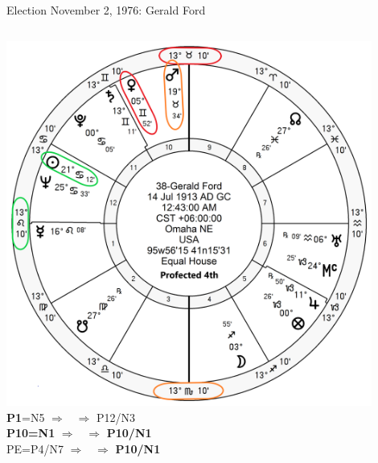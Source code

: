 \begin{frame}[t]{Election November 2, 1976: Gerald Ford}
\begin{columns}[T, onlytextwidth]
\vspace{-1em}
{\includegraphics[width=0.9\textwidth]{charts/Ford-Prof-4th.png}}
\fontsize{8pt}{9pt}\selectfont
\textbf{\dgreen P1}=N5
	$\Rightarrow$ \Sun\, $\Rightarrow$ P12/N3\\
\textbf{\red P10=N1}
	$\Rightarrow$ \Venus\, $\Rightarrow$ \textbf{\red P10/N1}\\
PE=P4/N7
	 $\Rightarrow$ \Mars\, $\Rightarrow$ \textbf{\red P10/N1}

\end{columns}
\end{frame}
